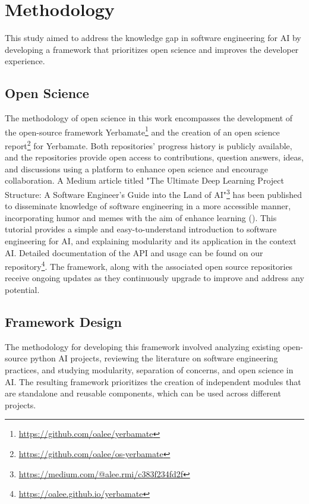


\section{Methodology}


This study aimed to address the knowledge gap in software engineering for AI by developing a framework that prioritizes open science and improves the developer experience. 

\subsection{Open Science}

The methodology of open science in this work encompasses the development of the open-source framework Yerbamate\footnote{\url{https://github.com/oalee/yerbamate}} and the creation of an open science report\footnote{ \url{https://github.com/oalee/os-yerbamate}} for Yerbamate. Both repositories' progress history is publicly available, and the repositories provide open access to contributions, question answers, ideas, and discussions using a platform to enhance open science and encourage collaboration. A Medium article titled "The Ultimate Deep Learning Project Structure: A Software Engineer’s Guide into the Land of AI"\footnote{\url{https://medium.com/@alee.rmi/c383f234fd2f}} has been published to disseminate knowledge of software engineering in a more accessible manner, incorporating humor and memes with the aim of enhance learning (\cite{powell1985humour}). This tutorial provides a simple and easy-to-understand introduction to software engineering for AI, and explaining modularity and its application in the context AI. Detailed documentation of the API and usage can be found on our repository\footnote{\url{https://oalee.github.io/yerbamate}}. The framework, along with the associated open source repositories receive ongoing updates as they continuously upgrade to improve and address any potential.

\subsection{Framework Design}

The methodology for developing this framework involved analyzing existing open-source python AI projects, reviewing the literature on software engineering practices, and studying modularity, separation of concerns, and open science in AI. The resulting framework prioritizes the creation of independent modules that are standalone and reusable components, which can be used across different projects.


